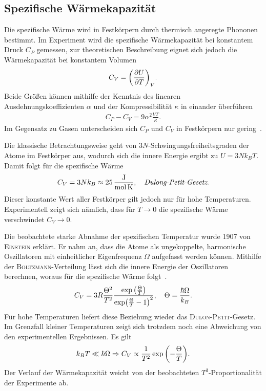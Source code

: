 \documentclass[parskip=half, a4paper,twoside,final]{article}
\begin{document}

\FloatBarrier

\subsection{Spezifische Wärmekapazität}
Die spezifische Wärme wird in Festkörpern durch thermisch angeregte Phononen bestimmt. Im Experiment wird die spezifische Wärmekapazität bei konstantem Druck $C_P$ gemessen, zur theoretischen Beschreibung eignet sich jedoch die Wärmekapazität bei konstantem Volumen
\begin{align}
  C_V = \qty(\pdv{U}{T})_V.
\end{align}
Beide Größen können mithilfe der Kenntnis des linearen Ausdehnungskoeffizienten $\alpha$ und der Kompressibilität $\kappa$ in einander überführen
\begin{align}
  C_P - C_V = 9 \alpha^2 \frac{V T}{\kappa}.
\end{align}
Im Gegensatz zu Gasen unterscheiden sich $C_P$ und $C_V$ in Festkörpern nur gering~\cite{Hunklinger}.

Die klassische Betrachtungsweise geht von $3N$-Schwingungsfreiheitsgraden der Atome im Festkörper aus, wodurch sich die innere Energie ergibt zu $U = 3 N k_B T$. Damit folgt für die spezifische Wärme
\begin{align}
  C_V = 3 N k_B \approx  \SI{25}{\joule\per\mole\per\kelvin}, \quad \emph{Dulong-Petit-Gesetz}.
\end{align}
Dieser konstante Wert aller Festkörper gilt jedoch nur für hohe Temperaturen. Experimentell zeigt sich nämlich, dass für $T \to 0$ die spezifische Wärme verschwindet $C_V \to 0$.

Die beobachtete starke Abnahme der spezifischen Temperatur wurde 1907 von \textsc{Einstein} erklärt. Er nahm an, dass die Atome als ungekoppelte, harmonische Oszillatoren mit einheitlicher Eigenfrequenz $\Omega$ aufgefasst werden können. Mithilfe der \textsc{Boltzmann}-Verteilung lässt sich die innere Energie der Oszillatoren berechnen, woraus für die spezifische Wärme folgt~\cite{Demtroeder3}.
\begin{align}
  C_V = 3R\frac{\Theta^2}{T^2} \frac{\exp\qty(\frac{\Theta}{T})}{\exp(\frac{\Theta}{T}-1)^2}, \quad \Theta = \frac{\hbar \Omega}{k_B}.
\end{align}
Für hohe Temperaturen liefert diese Beziehung wieder das \textsc{Dulon-Petit}-Gesetz. Im Grenzfall kleiner Temperaturen zeigt sich trotzdem noch eine Abweichung von den experimentellen Ergebnissen. Es gilt
\begin{align}
  k_B T \ll \hbar \Omega  \Rightarrow C_V \propto \frac{1}{T^2} \exp\qty(-\frac{\Theta}{T}).
\end{align}
Der Verlauf der Wärmekapazität weicht von der beobachteten $T^3$-Proportionalität der Experimente ab.
\end{document}
